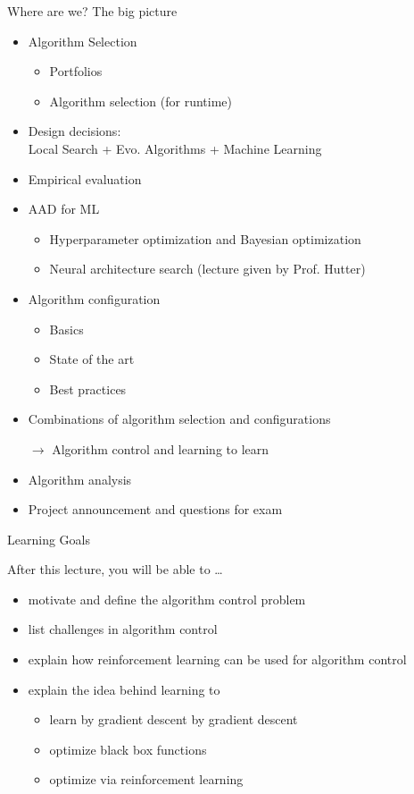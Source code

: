 \begin{frame}[c]{Where are we? The big picture}

\begin{itemize}
\item Algorithm Selection
  \begin{itemize}
    \item Portfolios
    \item Algorithm selection (for runtime)
  \end{itemize}
  \item Design decisions:\\ Local Search + Evo. Algorithms + Machine Learning 
  \item Empirical evaluation
  \item AAD for ML
  \begin{itemize}
    \item Hyperparameter optimization and Bayesian optimization 
    \item Neural architecture search (lecture given by Prof. Hutter)
  \end{itemize}
  \item Algorithm configuration 
  \begin{itemize}
    \item Basics 
    \item State of the art 
    \item Best practices 
  \end{itemize}
  \item Combinations of algorithm selection and configurations
  \item[$\to$] Algorithm control and learning to learn
  \item Algorithm analysis 
  \item Project announcement and questions for exam 
\end{itemize}

\end{frame}
\begin{frame}[c]{Learning Goals}

After this lecture, you will be able to \ldots

\begin{itemize}
  \item motivate and define the algorithm control problem
  \item list challenges in algorithm control
  \item explain how reinforcement learning can be used for algorithm control
  \item explain the idea behind learning to   
  \begin{itemize}
    \item learn by gradient descent by gradient descent
    \item optimize black box functions
    \item optimize via reinforcement learning
  \end{itemize}
\end{itemize}

\end{frame}

